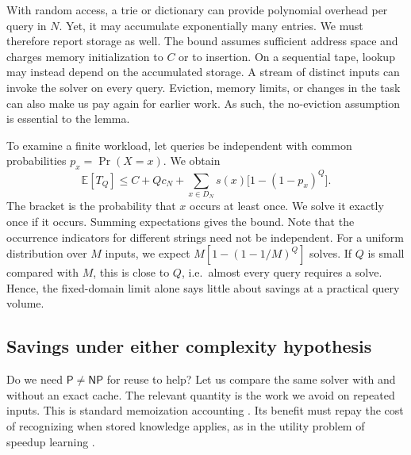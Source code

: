 \documentclass[11pt,a4paper]{article}
\numberwithin{equation}{section}
\newcommand{\Pclass}{\mathsf{P}}
\newcommand{\NPclass}{\mathsf{NP}}
\newcommand{\E}{\mathbb{E}}
\DeclareMathOperator{\Prb}{Pr}
\theoremstyle{plain}
\theoremstyle{definition}
\theoremstyle{remark}
\begin{document}
With random access, a trie or dictionary can provide polynomial overhead per query in $N$. Yet, it may accumulate exponentially many entries. We must therefore report storage as well. The bound assumes sufficient address space and charges memory initialization to $C$ or to insertion. On a sequential tape, lookup may instead depend on the accumulated storage. A stream of distinct inputs can invoke the solver on every query. Eviction, memory limits, or changes in the task can also make us pay again for earlier work. As such, the no-eviction assumption is essential to the lemma.

To examine a finite workload, let queries be independent with common probabilities $p_x=\Prb(X=x)$. We obtain
\begin{equation}
\E[T_Q]\leq C+Qc_N+
\sum_{x\in D_N}s(x)\bigl[1-(1-p_x)^Q\bigr].
\label{eq:cache-distribution}
\end{equation}
The bracket is the probability that $x$ occurs at least once. We solve it exactly once if it occurs. Summing expectations gives the bound. Note that the occurrence indicators for different strings need not be independent. For a uniform distribution over $M$ inputs, we expect $M[1-(1-1/M)^Q]$ solves. If $Q$ is small compared with $M$, this is close to $Q$, i.e.\ almost every query requires a solve. Hence, the fixed-domain limit alone says little about savings at a practical query volume.

\subsection{Savings under either complexity hypothesis}
\label{sec:reuse-savings}

Do we need $\Pclass\neq\NPclass$ for reuse to help? Let us compare the same solver with and without an exact cache. The relevant quantity is the work we avoid on repeated inputs. This is standard memoization accounting \citep{michie1968}. Its benefit must repay the cost of recognizing when stored knowledge applies, as in the utility problem of speedup learning \citep{minton1988utility}.
\end{document}

